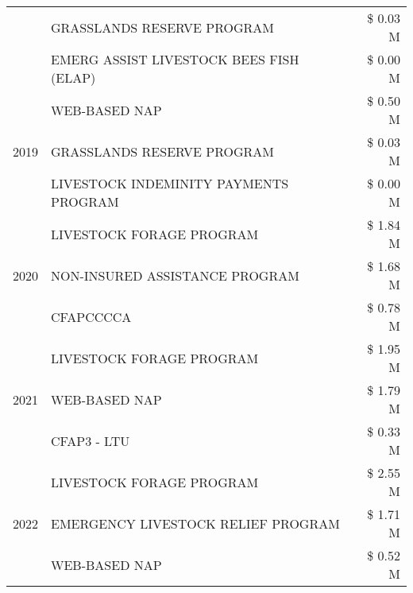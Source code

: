 \begin{tabular}{llr}
 & GRASSLANDS RESERVE PROGRAM & \$ 0.03 M \\
 & EMERG ASSIST LIVESTOCK BEES FISH (ELAP) & \$ 0.00 M \\
\cline{1-3}
\multirow[t]{3}{*}{2019} & WEB-BASED NAP & \$ 0.50 M \\
 & GRASSLANDS RESERVE PROGRAM & \$ 0.03 M \\
 & LIVESTOCK INDEMINITY PAYMENTS PROGRAM & \$ 0.00 M \\
\cline{1-3}
\multirow[t]{3}{*}{2020} & LIVESTOCK FORAGE PROGRAM & \$ 1.84 M \\
 & NON-INSURED ASSISTANCE PROGRAM & \$ 1.68 M \\
 & CFAPCCCCA & \$ 0.78 M \\
\cline{1-3}
\multirow[t]{3}{*}{2021} & LIVESTOCK FORAGE PROGRAM & \$ 1.95 M \\
 & WEB-BASED NAP & \$ 1.79 M \\
 & CFAP3 - LTU & \$ 0.33 M \\
\cline{1-3}
\multirow[t]{3}{*}{2022} & LIVESTOCK FORAGE PROGRAM & \$ 2.55 M \\
 & EMERGENCY LIVESTOCK RELIEF PROGRAM & \$ 1.71 M \\
 & WEB-BASED NAP & \$ 0.52 M \\
\cline{1-3}
\bottomrule
\end{tabular}
